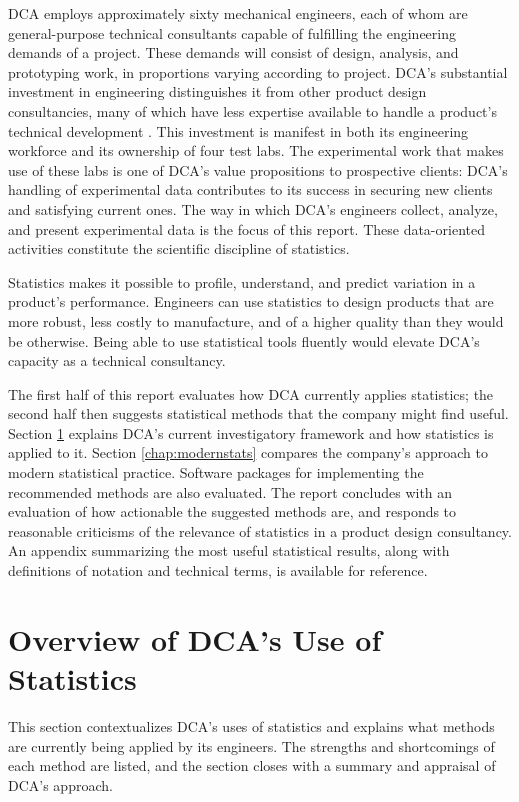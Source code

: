 \documentclass[11pt,a4paper,article]{memoir} %
\begin{document}
DCA employs approximately sixty mechanical engineers, each of whom are general-purpose technical consultants capable of fulfilling the engineering demands of a project. These demands will consist of design, analysis, and prototyping work, in proportions varying according to project. DCA's substantial investment in engineering distinguishes it from other product design consultancies, many of which have less expertise available to handle a product's technical development \cite{designweek}. This investment is manifest in both its engineering workforce and its ownership of four test labs. The experimental work that makes use of these labs is one of DCA's value propositions to prospective clients: DCA's handling of experimental data contributes to its success in securing new clients and satisfying current ones. The way in which DCA's engineers collect, analyze, and present experimental data is the focus of this report. These data-oriented activities constitute the scientific discipline of statistics.
\par
Statistics makes it possible to profile, understand, and predict variation in a product's performance. Engineers can use statistics to design products that are more robust, less costly to manufacture, and of a higher quality than they would be otherwise. Being able to use statistical tools fluently would elevate DCA's capacity as a technical consultancy.
\par
The first half of this report evaluates how DCA currently applies statistics; the second half then suggests statistical methods that the company might find useful. Section \ref{chap:dca} explains DCA's current investigatory framework and how statistics is applied to it. Section \ref{chap:modernstats} compares the company's approach to modern statistical practice. Software packages for implementing the recommended methods are also evaluated. The report concludes with an evaluation of how actionable the suggested methods are, and responds to reasonable criticisms of the relevance of statistics in a product design consultancy. An appendix summarizing the most useful statistical results, along with definitions of notation and technical terms, is available for reference.

\newpage



\chapter {Overview of DCA's Use of Statistics}
\label{chap:dca}
This section contextualizes DCA's uses of statistics and explains what methods are currently being applied by its engineers. The strengths and shortcomings of each method are listed, and the section closes with a summary and appraisal of DCA's approach.
\end{document}
